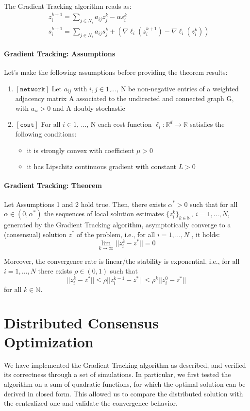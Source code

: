 The Gradient Tracking algorithm reads as:
\begin{align*}
& z_i^{k+1} = \sum_{j \in N_i} a_{ij} z_j^k - \alpha s_i^k \\
& s_i^{k+1} = \sum_{j \in N_i} a_{ij} s_j^k + (\nabla \ell_i(z_i^{k+1}) - \nabla \ell_i(z_i^{k}))
\end{align*}

\paragraph{Gradient Tracking: Assumptions}
Let's make the following assumptions before providing the theorem results:
\begin{enumerate}
    \item $[\texttt{network}]$ Let $a_{ij}$ with $i,j \in \text{{1,..., N}}$ be non-negative entries of a weighted adjacency matrix A associated to the undirected and connected graph G, with $a_{ii} > 0$ and A doubly stochastic
    \item $[\texttt{cost}]$ For all $i \in \text{{1, ..., N}} $ each cost function $\ell_i : \mathbb{R}^d \rightarrow \mathbb{R}$ satisfies the following conditions:
    \begin{itemize}
        \item it is strongly convex with coefficient $\mu > 0$
        \item it has Lipschitz continuous gradient with constant $L > 0$
    \end{itemize}
\end{enumerate}

\paragraph{Gradient Tracking: Theorem}
Let Assumptions 1 and 2 hold true.
Then, there exists $\alpha^* > 0$ such that for all $\alpha \in (0, \alpha^*)$ the sequences of local solution estimates $\{z_i^k\}_{k\in\mathbb{N}}, \ i = 1, ..., N$, generated by the Gradient Tracking algorithm, asymptotically converge to a
(consensual) solution $z^*$ of the problem, i.e., for all $i = 1, ... , N$ , it holds:
\[ \lim_{k \to \infty} ||z_i^k - z^*|| = 0 \]

Moreover, the convergence rate is linear/the stability is exponential, i.e., for all $i = 1, ..., N$ there exists $\rho \in (0, 1)$ such that
\[ ||z_i^k - z^*|| \leq \rho ||z_i^{k-1} - z^*|| \leq \rho^k ||z_i^{0} - z^*|| \]
for all $k \in \mathbb{N}$.

\section{Distributed Consensus Optimization}
We have implemented the Gradient Tracking algorithm as described, and verified its correctness through a set of simulations. In particular, we first tested the algorithm on a sum of quadratic functions, for which the optimal solution can be derived in closed form. This allowed us to compare the distributed solution with the centralized one and validate the convergence behavior.

